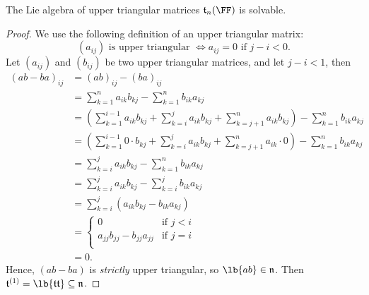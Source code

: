 \documentclass{article}
\DeclarePairedDelimiter\lb\lbrack\rbrack
\newcommand*\talg{\ensuremath{\mathfrak{t}}}
\newcommand*\nalg{\ensuremath{\mathfrak{n}}}
\begin{document}
\begin{proposition}
    The Lie algebra of upper triangular matrices $\talg_n(\FF)$ is solvable.
\end{proposition}
\begin{proof}
    We use the following definition of an upper triangular matrix:
    \[
        (a_{ij}) \text{ is upper triangular }
        \iff
        a_{ij} = 0 \text{ if } j - i < 0.
    \]
    Let $(a_{ij})$ and $(b_{ij})$ be two upper triangular matrices, and let $j - i < 1$, then
    \begin{align*}
        (ab - ba)_{ij}
        &=
        (ab)_{ij}
        -
        (ba)_{ij}
        \\
        &=
        \sum_{k=1}^n
        a_{ik}b_{kj}
        -
        \sum_{k=1}^n
        b_{ik}a_{kj}
        \\
        &=
        \left(
            \sum_{k=1}^{i-1}
            a_{ik}b_{kj}
            +
            \sum_{k=i}^j
            a_{ik}b_{kj}
            +
            \sum_{k=j+1}^n
            a_{ik}b_{kj}
        \right)
        -
        \sum_{k=1}^n
        b_{ik}a_{kj}
        \\
        &=
        \left(
            \sum_{k=1}^{i-1}
            0 \cdot b_{kj}
            +
            \sum_{k=i}^j
            a_{ik}b_{kj}
            +
            \sum_{k=j+1}^n
            a_{ik} \cdot 0
        \right)
        -
        \sum_{k=1}^n
        b_{ik}a_{kj}
        \\
        &=
        \sum_{k=i}^j
        a_{ik}b_{kj}
        -
        \sum_{k=1}^n
        b_{ik}a_{kj}
        \\
        &=
        \sum_{k=i}^j
        a_{ik}b_{kj}
        -
        \sum_{k=i}^j
        b_{ik}a_{kj}
        \\
        &=
        \sum_{k=i}^j
        (a_{ik}b_{kj} - b_{ik}a_{kj})
        \\
        &=
        \begin{cases}
            0 & \text{if }j < i \\
            a_{jj}b_{jj} - b_{jj}a_{jj} & \text{if }j = i \\
        \end{cases}
        \\
        &=
        0.
    \end{align*}
    Hence, $(ab - ba)$ is \textit{strictly} upper triangular, so $\lb{ab} \in \nalg$.
    Then $\talg^{(1)} = \lb{\talg\talg} \subseteq \nalg$.


\end{proof}
\end{document}
